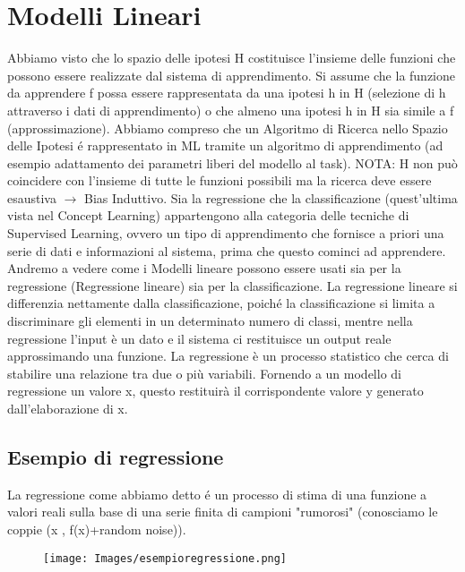 \documentclass{article}
\begin{document}
\section{Modelli Lineari}
Abbiamo visto che lo spazio delle ipotesi H costituisce l’insieme delle funzioni che possono essere realizzate dal sistema di apprendimento. Si assume che la funzione da apprendere f possa essere rappresentata da una ipotesi h in H (selezione di h attraverso i dati di apprendimento) o che almeno una ipotesi h in H sia simile a f (approssimazione). Abbiamo compreso che un Algoritmo di Ricerca nello Spazio delle Ipotesi é rappresentato in ML tramite un algoritmo di apprendimento (ad esempio adattamento dei parametri liberi del modello al task). NOTA: H non può coincidere con l’insieme di tutte le funzioni possibili ma la ricerca deve essere esaustiva $\rightarrow$ Bias Induttivo. \newline
Sia la regressione che la classificazione (quest'ultima vista nel Concept Learning) appartengono alla categoria delle tecniche di Supervised Learning, ovvero un tipo di apprendimento che fornisce a priori una serie di dati e informazioni al sistema, prima che questo cominci ad apprendere. Andremo a vedere come i Modelli lineare possono essere usati sia per la regressione (Regressione lineare) sia per la classificazione. La regressione lineare si differenzia nettamente dalla classificazione, poiché la classificazione si limita a discriminare gli elementi in un determinato numero di classi, mentre nella regressione l’input è un dato e il sistema ci restituisce un output reale approssimando una funzione. La regressione è un processo statistico che cerca di stabilire una relazione tra due o più variabili. Fornendo a un modello di regressione un valore x, questo restituirà il corrispondente valore y generato dall'elaborazione di x.

\subsection{Esempio di regressione}
La regressione come abbiamo detto é un processo di stima di una funzione a valori reali sulla base di una serie finita di campioni "rumorosi" (conosciamo le coppie (x , f(x)+random noise)).
\begin{figure}[H]
    \centering
    \texttt{[image: Images/esempioregressione.png]}
\end{figure}
\end{document}
